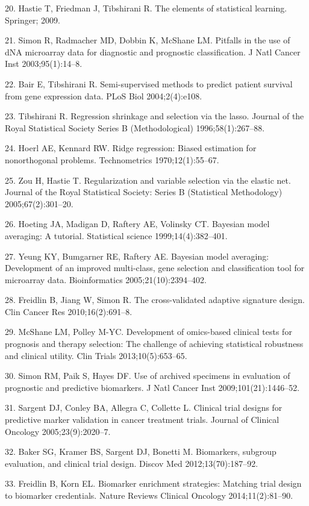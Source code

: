 \documentclass[11pt]{article}
\begin{document}
20. Hastie T, Friedman J, Tibshirani R. The elements of statistical
learning. Springer; 2009.

21. Simon R, Radmacher MD, Dobbin K, McShane LM. Pitfalls in the use of
dNA microarray data for diagnostic and prognostic classification. J Natl
Cancer Inst 2003;95(1):14--8.

22. Bair E, Tibshirani R. Semi-supervised methods to predict patient
survival from gene expression data. PLoS Biol 2004;2(4):e108.

23. Tibshirani R. Regression shrinkage and selection via the lasso.
Journal of the Royal Statistical Society Series B (Methodological)
1996;58(1):267--88.

24. Hoerl AE, Kennard RW. Ridge regression: Biased estimation for
nonorthogonal problems. Technometrics 1970;12(1):55--67.

25. Zou H, Hastie T. Regularization and variable selection via the
elastic net. Journal of the Royal Statistical Society: Series B
(Statistical Methodology) 2005;67(2):301--20.

26. Hoeting JA, Madigan D, Raftery AE, Volinsky CT. Bayesian model
averaging: A tutorial. Statistical science 1999;14(4):382--401.

27. Yeung KY, Bumgarner RE, Raftery AE. Bayesian model averaging:
Development of an improved multi-class, gene selection and
classification tool for microarray data. Bioinformatics
2005;21(10):2394--402.

28. Freidlin B, Jiang W, Simon R. The cross-validated adaptive signature
design. Clin Cancer Res 2010;16(2):691--8.

29. McShane LM, Polley M-YC. Development of omics-based clinical tests
for prognosis and therapy selection: The challenge of achieving
statistical robustness and clinical utility. Clin Trials
2013;10(5):653--65.

30. Simon RM, Paik S, Hayes DF. Use of archived specimens in evaluation
of prognostic and predictive biomarkers. J Natl Cancer Inst
2009;101(21):1446--52.

31. Sargent DJ, Conley BA, Allegra C, Collette L. Clinical trial designs
for predictive marker validation in cancer treatment trials. Journal of
Clinical Oncology 2005;23(9):2020--7.

32. Baker SG, Kramer BS, Sargent DJ, Bonetti M. Biomarkers, subgroup
evaluation, and clinical trial design. Discov Med 2012;13(70):187--92.

33. Freidlin B, Korn EL. Biomarker enrichment strategies: Matching trial
design to biomarker credentials. Nature Reviews Clinical Oncology
2014;11(2):81--90.
\end{document}
